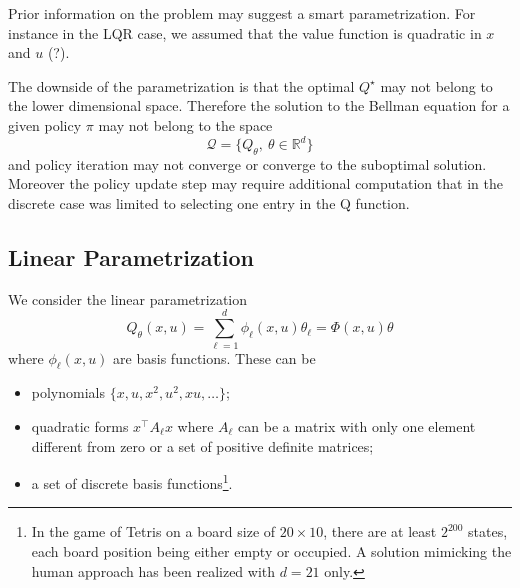Prior information on the problem may suggest a smart parametrization. For instance in the LQR case, we assumed that the value function is quadratic in $x$ and $u$ (?).

The downside of the parametrization is that the optimal $Q^\star$  may not belong to the lower dimensional space. Therefore the solution to the Bellman equation for a given policy $\pi$ may not belong to the space
\begin{equation*}
  \mathcal{Q} = \{Q_\theta,\ \theta\in\mathbb{R}^d\}
\end{equation*}
and policy iteration may not converge or converge to the suboptimal solution. Moreover the policy update step may require additional computation that in the discrete case was limited to selecting one entry in the Q function.

\subsection{Linear Parametrization}
\label{sec:RL-linear-parametrization}

We consider the linear parametrization
\begin{equation}
  \label{eq:Q-linear-parametrization}
  Q_\theta(x,u) = \sum_{\ell=1}^d \phi_\ell(x,u)\theta_\ell = \Phi(x,u)\theta
\end{equation}
where $\phi_\ell(x,u)$ are basis functions. These can be
\begin{itemize}
\item polynomials $\{x, u, x^2, u^2, xu,\ldots\}$;
\item quadratic forms $x^\top A_\ell x$ where $A_\ell$ can be a matrix with only one element different from zero or a set of positive definite matrices;
\item a set of discrete basis functions\footnote{In the game of Tetris on a board size of $20\times 10$, there are at least $2^{200}$ states, each board position being either empty or occupied. A solution mimicking the human approach has been realized with $d=21$ only.}.
\end{itemize}

